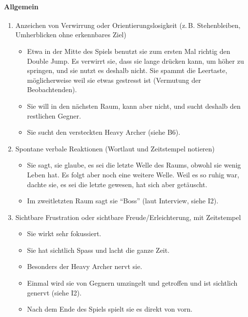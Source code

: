 \documentclass[../Main.tex]{subfiles}
\begin{document}
\paragraph{Allgemein}
\begin{enumerate}[label=\textbf{B\arabic*}, leftmargin=1.5cm, itemsep=0.8em, resume]
    \item Anzeichen von Verwirrung oder Orientierungslosigkeit (z.\,B. Stehenbleiben, Umherblicken ohne erkennbares Ziel)
    \begin{itemize}[nosep]
        \item Etwa in der Mitte des Spiels benutzt sie zum ersten Mal richtig den Double Jump. Es verwirrt sie, dass sie lange drücken kann, um höher zu springen, und sie nutzt es deshalb nicht. Sie spammt die Leertaste, möglicherweise weil sie etwas gestresst ist (Vermutung der Beobachtenden).
        \item Sie will in den nächsten Raum, kann aber nicht, und sucht deshalb den restlichen Gegner.
        \item Sie sucht den versteckten Heavy Archer (siehe B6).
    \end{itemize}

    \item Spontane verbale Reaktionen (Wortlaut und Zeitstempel notieren)
    \begin{itemize}[nosep]
        \item Sie sagt, sie glaube, es sei die letzte Welle des Raums, obwohl sie wenig Leben hat. Es folgt aber noch eine weitere Welle. Weil es so ruhig war, dachte sie, es sei die letzte gewesen, hat sich aber getäuscht.
        \item Im zweitletzten Raum sagt sie \enquote{Boss} (laut Interview, siehe I2).
    \end{itemize}

    \item Sichtbare Frustration oder sichtbare Freude/Erleichterung, mit Zeitstempel
    \begin{itemize}[nosep]
        \item Sie wirkt sehr fokussiert.
        \item Sie hat sichtlich Spass und lacht die ganze Zeit.
        \item Besonders der Heavy Archer nervt sie.
        \item Einmal wird sie von Gegnern umzingelt und getroffen und ist sichtlich genervt (siehe I2).
        \item Nach dem Ende des Spiels spielt sie es direkt von vorn.
    \end{itemize}


\end{enumerate}
\end{document}
